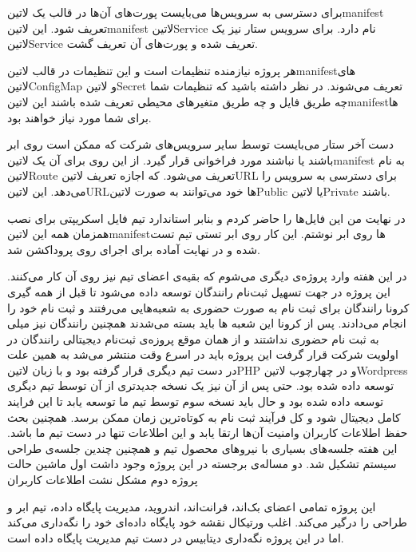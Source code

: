 \documentclass[a4]{report}
\begin{document}
برای دسترسی به سرویس‌ها می‌بایست پورت‌های آن‌ها در قالب یک ‌لاتین{manifest} تعریف شود. این ‌لاتین{manifest} ‌لاتین{Service} نام دارد.
برای سرویس ستار نیز یک ‌لاتین{Service} تعریف شده و پورت‌های آن تعریف گشت.

هر پروژه نیازمنده تنظیمات است و این تنظیمات در قالب ‌لاتین{manifest}های ‌لاتین{ConfigMap} و ‌لاتین{Secret} تعریف می‌شوند.
در نظر داشته باشید که تنظیمات شما چه طریق فایل و چه طریق متغیرهای محیطی تعریف شده باشند این ‌لاتین{manifest}ها برای شما مورد نیاز خواهند بود.

دست آخر ستار می‌بایست توسط سایر سرویس‌های شرکت که ممکن است روی ابر باشند یا نباشند مورد فراخوانی قرار گیرد. از این روی برای آن یک ‌لاتین{manifest}
به نام ‌لاتین{Route} تعریف می‌شود. که اجازه تعریف ‌لاتین{URL} برای دسترسی به سرویس را می‌دهد.
این ‌لاتین{URL}ها خود می‌توانند به صورت ‌لاتین{Public} یا ‌لاتین{Private} باشند.

در نهایت من این فایل‌ها را حاضر کردم و بنابر استاندارد تیم فایل اسکریپتی برای نصب همزمان همه این ‌لاتین{manifest}ها روی ابر نوشتم.
این کار روی ابر تستی تیم تست شده و در نهایت آماده برای اجرای روی پروداکشن شد.

در این هفته وارد پروژه‌ی دیگری می‌شوم که بقیه‌ی اعضای تیم نیز روی آن کار می‌کنند.
این پروژه در جهت تسهیل ثبت‌نام رانندگان توسعه داده می‌شود تا قبل از همه گیری کرونا رانندگان برای ثبت نام به صورت حضوری به شعبه‌هایی می‌رفتند و ثبت نام خود را انجام می‌دادند.
پس از کرونا این شعبه ها باید بسته می‌شدند همچنین رانندگان نیز میلی به ثبت نام حضوری نداشتند و از همان موقع پروزه‌ی ثبت‌نام دیجیتالی رانندگان در اولویت شرکت قرار گرفت این پروژه باید در اسرع وقت منتشر می‌شد
به همین علت در دست تیم دیگری قرار گرفته بود و با زبان ‌لاتین{PHP} و در چهارچوب ‌لاتین{Wordpress} توسعه داده شده بود.
حتی پس از آن نیز یک نسخه جدیدتری از آن توسط تیم دیگری توسعه داده شده بود و حال باید نسخه سوم توسط تیم ما توسعه یابد تا این فرایند کامل دیجیتال شود و کل فرآیند ثبت نام به کوتاه‌ترین زمان ممکن برسد.
همچنین بحث حفظ اطلاعات کاربران وامنیت آن‌ها ارتقا یابد و این اطلاعات تنها در دست تیم ما باشد.
این هفته جلسه‌های بسیاری با نیروهای محصول تیم و همچنین چندین جلسه‌ی طراحی سیستم تشکیل شد. دو مساله‌ی برجسته در این پروژه وجود داشت اول ماشین حالت پروژه دوم مشکل نشت اطلاعات کاربران

این پروژه تمامی اعضای بک‌اند، فرانت‌اند، اندروید، مدیریت پایگاه داده، تیم ابر و طراحی را درگیر می‌کند. اغلب ورتیکال نقشه خود پایگاه داده‌ای‌ خود را نگه‌داری می‌کند اما در این پروژه نگه‌داری دیتابیس در دست تیم مدیریت پایگاه داده است.
\end{document}
